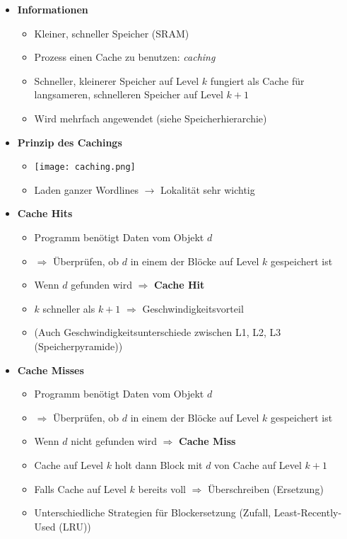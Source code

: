     \begin{itemize}
        \item \textbf{Informationen}
            \begin{itemize}
                \item Kleiner, schneller Speicher (SRAM)
                \item Prozess einen Cache zu benutzen: \textit{caching}
                \item Schneller, kleinerer Speicher auf Level $k$ fungiert als Cache für langsameren, schnelleren Speicher auf Level $k+1$
                \item Wird mehrfach angewendet (siehe Speicherhierarchie)
            \end{itemize}

        \item \textbf{Prinzip des Cachings}
            \begin{itemize}
                \item[] \texttt{[image: caching.png]}
                \item Laden ganzer Wordlines $\rightarrow$ Lokalität sehr wichtig
            \end{itemize}

        \item \textbf{Cache Hits}
            \begin{itemize}
                \item Programm benötigt Daten vom Objekt $d$
                \item[] $\Rightarrow$ Überprüfen, ob $d$ in einem der Blöcke auf Level $k$ gespeichert ist
                \item Wenn $d$ gefunden wird $\Rightarrow$ \textbf{Cache Hit}
                \item $k$ schneller als $k+1$ $\Rightarrow$ Geschwindigkeitsvorteil
                \item (Auch Geschwindigkeitsunterschiede zwischen L1, L2, L3 (Speicherpyramide))
            \end{itemize}

        \item \textbf{Cache Misses}
            \begin{itemize}
                \item Programm benötigt Daten vom Objekt $d$
                \item[] $\Rightarrow$ Überprüfen, ob $d$ in einem der Blöcke auf Level $k$ gespeichert ist
                \item Wenn $d$ nicht gefunden wird $\Rightarrow$ \textbf{Cache Miss}
                \item Cache auf Level $k$ holt dann Block mit $d$ von Cache auf Level $k+1$
                \item Falls Cache auf Level $k$ bereits voll $\Rightarrow$ Überschreiben (Ersetzung)
                \item Unterschiedliche Strategien für Blockersetzung (Zufall, Least-Recently-Used (LRU))
            \end{itemize}


\end{itemize}
